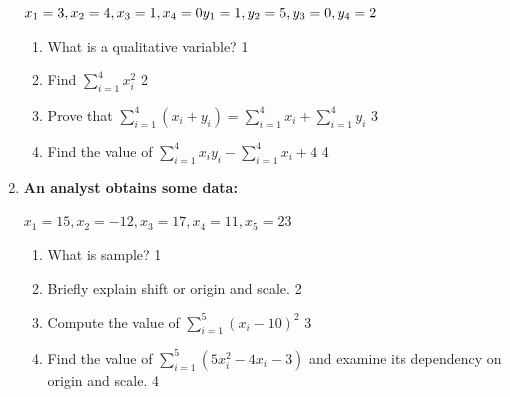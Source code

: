 \documentclass[a4paper,oneside]{book}
\begin{document}
\begin{enumerate}
  $x_1=3, x_2=4, x_3=1, x_4=0 \\
	  y_1=1, y_2=5, y_3=0, y_4=2$
  
  \begin{enumerate}
    \item
	What is a qualitative variable? \hfill 1
    \item
	Find $\displaystyle \sum_{i=1}^{4}x_i^2$ \hfill 2
    \item  
	Prove that $\displaystyle \sum_{i=1}^{4} (x_i+y_i) = \sum_{i=1}^{4}x_i + \sum_{i=1}^{4}y_i $ \hfill 3
    \item
	Find the value of $\displaystyle \sum_{i=1}^{4} x_iy_i-\sum_{i=1}^{4} x_i+4$ \hfill 4

  \end{enumerate}
  
   \item
	  \textbf{An analyst obtains some data:}
	  \begin{center}
	  $x_1=15, x_2=-12, x_3=17, x_4=11, x_5=23$
  \end{center}
  \begin{enumerate}
    \item
	What is sample? \hfill 1
    \item
	Briefly explain shift or origin and scale. \hfill 2
    \item  
	Compute the value of $\displaystyle \sum_{i=1}^5 (x_i-10)^2$ \hfill 3
    \item
	Find the value of $\displaystyle \sum_{i=1}^5 (5x_i^2-4x_i-3)$ and examine its dependency on origin and scale. \hfill 4
  \end{enumerate}

  
  \end{enumerate}
\end{document}
